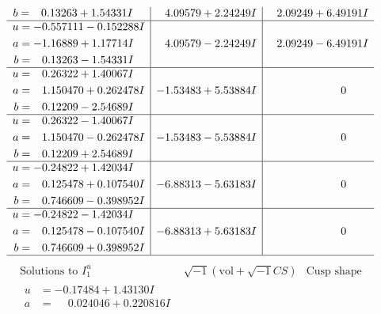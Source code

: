 \documentclass[1p]{elsarticle_modified}
\theoremstyle{definition}
\newcommand{\I}{\sqrt{-1}}
\begin{document}
$$\begin{array}{c|c|c}
\begin{aligned}
b &= \phantom{-}0.13263 + 1.54331 I\end{aligned}
 & \phantom{-}4.09579 + 2.24249 I & \phantom{-}2.09249 + 6.49191 I \\ \hline\begin{aligned}
u &= -0.557111 - 0.152288 I \\
a &= -1.16889 + 1.17714 I \\
b &= \phantom{-}0.13263 - 1.54331 I\end{aligned}
 & \phantom{-}4.09579 - 2.24249 I & \phantom{-}2.09249 - 6.49191 I \\ \hline\begin{aligned}
u &= \phantom{-}0.26322 + 1.40067 I \\
a &= \phantom{-}1.150470 + 0.262478 I \\
b &= \phantom{-}0.12209 - 2.54689 I\end{aligned}
 & -1.53483 + 5.53884 I & \phantom{-0.000000 } 0 \\ \hline\begin{aligned}
u &= \phantom{-}0.26322 - 1.40067 I \\
a &= \phantom{-}1.150470 - 0.262478 I \\
b &= \phantom{-}0.12209 + 2.54689 I\end{aligned}
 & -1.53483 - 5.53884 I & \phantom{-0.000000 } 0 \\ \hline\begin{aligned}
u &= -0.24822 + 1.42034 I \\
a &= \phantom{-}0.125478 + 0.107540 I \\
b &= \phantom{-}0.746609 - 0.398952 I\end{aligned}
 & -6.88313 - 5.63183 I & \phantom{-0.000000 } 0 \\ \hline\begin{aligned}
u &= -0.24822 - 1.42034 I \\
a &= \phantom{-}0.125478 - 0.107540 I \\
b &= \phantom{-}0.746609 + 0.398952 I\end{aligned}
 & -6.88313 + 5.63183 I & \phantom{-0.000000 } 0\\
 \hline 
 \end{array}$$\newpage$$\begin{array}{c|c|c}  
\text{Solutions to }I^u_{1}& \I (\text{vol} + \sqrt{-1}CS) & \text{Cusp shape}\\
 \hline 
\begin{aligned}
u &= -0.17484 + 1.43130 I \\
a &= \phantom{-}0.024046 + 0.220816 I \\

\end{aligned}
\end{array}$$
\end{document}

